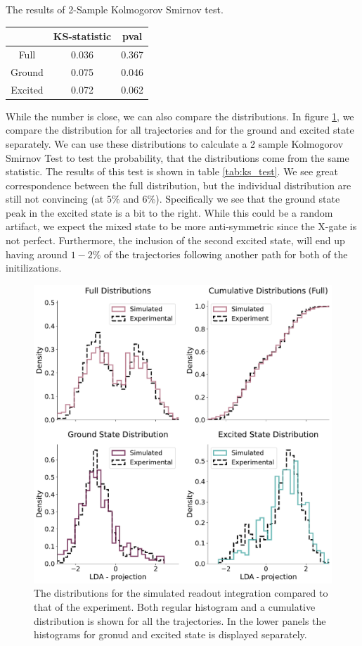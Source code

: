 \begin{margintable}[- 1 cm]
    \caption{The results of 2-Sample Kolmogorov Smirnov test.}
    \centering
    \begin{tabular}{c|cc}
                & KS-statistic & pval  \\ \hline
    Full        & 0.036 & 0.367         \\
    Ground      & 0.075 & 0.046         \\
    Excited     & 0.072 & 0.062
    \end{tabular}
    \label{tab:ks_test}
\end{margintable}
While the number is close, we can also compare the distributions. In figure \ref{fig:distributions_for_ks}, we compare the distribution for all trajectories and for the ground and excited state separately. We can use these distributions to calculate a 2 sample Kolmogorov Smirnov Test\cite{panchenko_lecture_nodate} to test the probability, that the distributions come from the same statistic. The results of this test is shown in table \ref{tab:ks_test}. We see great correspondence between the full distribution, but the individual distribution are still not convincing (at $5 \%$ and $6\%$). Specifically we see that the ground state peak in the excited state is a bit to the right. While this could be a random artifact, we expect the mixed state to be more anti-symmetric since the X-gate is not perfect. Furthermore, the inclusion of the second excited state, will end up having around $1-2 \%$ of the trajectories following another path for both of the initilizations.


\begin{figure}
    \centering
    \includegraphics{Readout/Figs/Weighted_comparison_with_simmulation.pdf}
    \caption{The distributions for the simulated readout integration compared to that of the experiment. Both regular histogram and a cumulative distribution is shown for all the trajectories. In the lower panels the histograms for gronud and excited state is displayed separately. }
    \label{fig:distributions_for_ks}
\end{figure}
